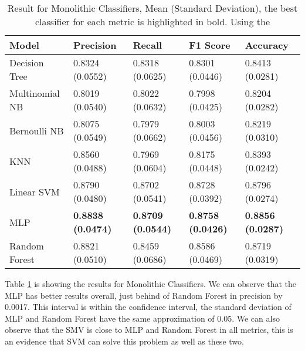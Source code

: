 \begin{table}[h!]
    \centering
    \renewcommand{\arraystretch}{1.8}
    \begin{tabular}{ p{3cm}p{2.8cm}p{2.8cm}p{2.8cm}p{2.8cm} }
        \toprule
        Model & Precision & Recall & F1 Score & Accuracy \\
        \midrule
        Decision Tree &     0.8324 (0.0552) & 0.8318 (0.0625) & 0.8301 (0.0446) & 0.8413 (0.0281) \\
        Multinomial NB &    0.8019 (0.0540) & 0.8022 (0.0632) & 0.7998 (0.0425) & 0.8204 (0.0282) \\
        Bernoulli NB &      0.8075 (0.0549) & 0.7979 (0.0662) & 0.8003 (0.0456) & 0.8219 (0.0310) \\
        KNN &               0.8560 (0.0488) & 0.7969 (0.0604) & 0.8175 (0.0448) & 0.8393 (0.0242) \\
        Linear SVM &        0.8790 (0.0480) & 0.8702 (0.0541) & 0.8728 (0.0392) & 0.8796 (0.0274) \\
        MLP &               \textbf{0.8838 (0.0474)} & \textbf{0.8709 (0.0544)} & \textbf{0.8758 (0.0426)} & \textbf{0.8856 (0.0287)} \\
        Random Forest &     0.8821 (0.0510) & 0.8459 (0.0686) & 0.8586 (0.0469) & 0.8719 (0.0319) \\ [1ex]
        \bottomrule
        \end{tabular}
        \caption{%
        Result for Monolithic Classifiers, Mean (Standard Deviation), the best classifier for each metric is highlighted in bold. Using the %
        }\label{table:result_monolithic}
\end{table}

Table \ref{table:result_monolithic} is showing the results for Monolithic Classifiers. We can observe that the MLP has better results overall, just behind of Random Forest in precision by 0.0017. This interval is within the confidence interval, the standard deviation of MLP and Random Forest have the same approximation of 0.05. We can also observe that the SMV is close to MLP and Random Forest in all metrics, this is an evidence that SVM can solve this problem as well as these two.